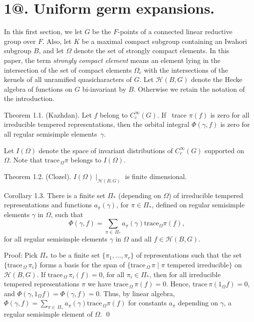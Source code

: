 \documentclass{amsart}
\begin{document}
\section{{{\bf 1@.  Uniform germ expansions.}}}


\medskip
\noindent
In this first section, we let $G$ be the $F$-points of a 
  connected linear reductive group over $F$. Also, let $K$ 
  be a maximal
  compact subgroup containing an Iwahori subgroup $B$, and
let
   $ \Omega $
denote the set of strongly compact elements.  In this paper, the term
{\it strongly compact element} means an element lying in the
intersection of the set of compact elements $\Omega_c$ with
the intersections of the kernels of all unramified quasicharacters of $G$.
Let 
  $ {\mathcal H} (B,G) $
denote the Hecke algebra of functions on $G$ bi-invariant
  by $B$.
Otherwise we retain the notation of the introduction.

\proclaim Theorem {1.1.} {\rm (Kazhdan)}.
Let
  $ f$ belong to $C_c^{\infty} (G) $.
If \, {\rm trace}
  $ \pi (f)$ is zero 
for all irreducible tempered representations, then the orbital integral
  $ \Phi (\gamma,f) $ is zero
for all regular semisimple elements~$ \gamma $.
\finishproclaim

Let
  $ I (\Omega) $
denote the space of invariant distributions of
  $ C_c^{\infty} (G) $
supported on $\Omega$.
Note that 
  $ \text{trace}_{\,\Omega} \pi $ belongs to $I(\Omega) $.

\proclaim Theorem {1.2.} {\rm (Clozel)}.
  $ I (\Omega) \mid_{{\mathcal H}(B,G)} $
is finite dimensional.
\finishproclaim

\proclaim Corollary {1.3}.
There is a finite set
  $ \Pi_* $ (depending on $\Omega$)
of irreducible tempered representations and functions
  $ a_{\pi} (\gamma) $,
for 
  $ \pi \in \Pi_* $,
defined on regular semisimple elements
  $ \gamma $ 
in
  $ \Omega $,
such that
%
$$
  \Phi (\gamma, f) 
=
   \sum_{\pi \in \, \Pi_*}
  a_{\pi} (\gamma) 
  \text{trace}_\Omega{\pi} (f),
$$
%
for all 
regular semisimple elements $\gamma$ in 
  $ \Omega $
and all 
  $ f \in {\mathcal H} (B,G) $.
\finishproclaim

\pproclaim Proof:
Pick $\Pi_*$ to be a finite set 
  $ \{\pi_1, \dots , \pi_r \} $
  of representations
such that the set
  $\{ \text{trace}_{\,\Omega} \, \pi_i \}$
forms a basis for the span of
  $ \{ \text{trace}_{\,\Omega} \, \pi \mid
    \pi \,\, \text{tempered irreducible} \} $
on 
  $ {\mathcal H} (B,G) $.
If
  $ \text{trace}_{\,\Omega} \, \pi_i (f) = 0 $, for all $\pi_i\in\Pi_*$,
then for all irreducible tempered representations $\pi$ we have
  $ \text{trace}_{\,\Omega} \, \pi (f) = 0 $.
Hence,
  $ \text{trace} \, \pi (1_{\Omega} f) = 0 $,
and
  $ \Phi (\gamma, 1_{\Omega} f) = 
    \Phi (\gamma, f) = 0 $.
Thus, by linear algebra,
  $ \Phi (\gamma,f) = 
    \sum_{\pi \in \,\Pi_*} 
    a_{\pi} (\gamma) \text{trace}_{\,\Omega}\pi(f) $
for constants
  $ a_{\pi} $
depending on
  $ \gamma$, a regular
  semisimple element of $\Omega$.
\qed
\finishpproclaim
\end{document}
